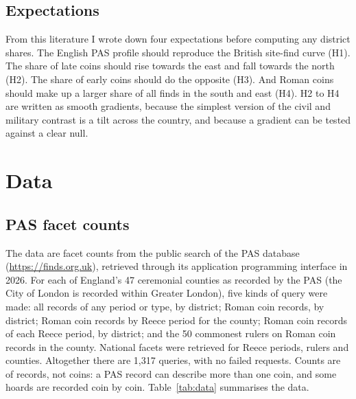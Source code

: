 \documentclass[11pt,a4paper]{article}
\begin{document}
\subsection{Expectations}
From this literature I wrote down four expectations before computing any district shares. The English PAS profile should reproduce the British site-find curve (H1). The share of late coins should rise towards the east and fall towards the north (H2). The share of early coins should do the opposite (H3). And Roman coins should make up a larger share of all finds in the south and east (H4). H2 to H4 are written as smooth gradients, because the simplest version of the civil and military contrast is a tilt across the country, and because a gradient can be tested against a clear null.

\section{Data}\label{sec:data}
\subsection{PAS facet counts}
The data are facet counts from the public search of the PAS database (\url{https://finds.org.uk}), retrieved through its application programming interface in 2026. For each of England's 47 ceremonial counties as recorded by the PAS (the City of London is recorded within Greater London), five kinds of query were made: all records of any period or type, by district; Roman coin records, by district; Roman coin records by Reece period for the county; Roman coin records of each Reece period, by district; and the 50 commonest rulers on Roman coin records in the county. National facets were retrieved for Reece periods, rulers and counties. Altogether there are 1,317 queries, with no failed requests. Counts are of records, not coins: a PAS record can describe more than one coin, and some hoards are recorded coin by coin. Table~\ref{tab:data} summarises the data.
\end{document}
